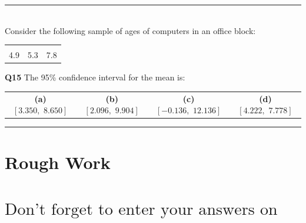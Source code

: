 \documentclass[12pt]{article}
\begin{document}
%





\rule{\linewidth}{1pt}

\quad\\
Consider the following sample of ages of computers in an office block:
\begin{center}
\begin{tabular}{|ccc|}
\hline
&&\\[-0.3cm]
4.9 & 5.3 & 7.8 \\[0.1cm]
\hline
\end{tabular}
\end{center}
{\bf Q15} The 95\% confidence interval for the mean is:\\[0.2cm]
\begin{tabular}{cccc}
{\bf(a)} $[3.350,\,\,8.650]$ & {\bf(b)} $[2.096,\,\,9.904]$ & {\bf(c)} $[-0.136,\,\,12.136]$ & {\bf(d)} $[4.222,\,\,7.778]$ \\[0.6cm]
\end{tabular}

\quad

\rule{\linewidth}{1pt}








\newpage

\section*{Rough Work\\[23cm]}
\section*{\hspace{2cm}$\boxed{\text{Don't forget to enter your answers on the last page!}}$}

\newpage
\end{document}
